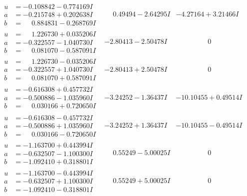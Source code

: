 \documentclass[1p]{elsarticle_modified}
\theoremstyle{definition}
\begin{document}
$$\begin{array}{c|c|c}
\begin{aligned}
u &= -0.108842 - 0.774169 I \\
a &= -0.215748 + 0.202638 I \\
b &= \phantom{-}0.884831 - 0.268769 I\end{aligned}
 & \phantom{-}0.49494 - 2.64295 I & -4.27164 + 3.21466 I \\ \hline\begin{aligned}
u &= \phantom{-}1.226730 + 0.035206 I \\
a &= -0.322557 - 1.040730 I \\
b &= \phantom{-}0.081070 - 0.587091 I\end{aligned}
 & -2.80413 - 2.50478 I & \phantom{-0.000000 } 0 \\ \hline\begin{aligned}
u &= \phantom{-}1.226730 - 0.035206 I \\
a &= -0.322557 + 1.040730 I \\
b &= \phantom{-}0.081070 + 0.587091 I\end{aligned}
 & -2.80413 + 2.50478 I & \phantom{-0.000000 } 0 \\ \hline\begin{aligned}
u &= -0.616308 + 0.457732 I \\
a &= -0.500886 - 1.035960 I \\
b &= \phantom{-}0.030166 + 0.720650 I\end{aligned}
 & -3.24252 - 1.36437 I & -10.10455 + 0.49514 I \\ \hline\begin{aligned}
u &= -0.616308 - 0.457732 I \\
a &= -0.500886 + 1.035960 I \\
b &= \phantom{-}0.030166 - 0.720650 I\end{aligned}
 & -3.24252 + 1.36437 I & -10.10455 - 0.49514 I \\ \hline\begin{aligned}
u &= -1.163700 + 0.443994 I \\
a &= -0.632507 - 1.100300 I \\
b &= -1.092410 + 0.318801 I\end{aligned}
 & \phantom{-}0.55249 - 5.00025 I & \phantom{-0.000000 } 0 \\ \hline\begin{aligned}
u &= -1.163700 - 0.443994 I \\
a &= -0.632507 + 1.100300 I \\
b &= -1.092410 - 0.318801 I\end{aligned}
 & \phantom{-}0.55249 + 5.00025 I & \phantom{-0.000000 } 0 \\ \hline\begin{aligned}

\end{aligned}
\end{array}$$
\end{document}

